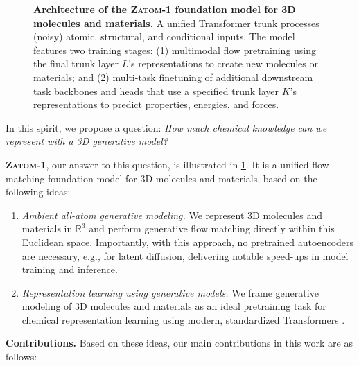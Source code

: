 \documentclass{article}
\theoremstyle{plain}
\theoremstyle{definition}
\theoremstyle{remark}
\begin{document}
\begin{figure}[!ht]
    \centering
    \resizebox{\textwidth}{!}{%
        
    } %
    \caption{\textbf{Architecture of the \textsc{Zatom-1} foundation model for 3D molecules and materials.} A unified Transformer trunk processes (noisy) atomic, structural, and conditional inputs. The model features two training stages: (1) multimodal flow pretraining using the final trunk layer $L$'s representations to create new molecules or materials; and (2) multi-task finetuning of additional downstream task backbones and heads that use a specified trunk layer $K$'s representations to predict properties, energies, and forces.
    }
    \label{figure:zatom_1_overview}
\end{figure}

In this spirit, we propose a question: \textit{How much chemical knowledge can we represent with a 3D generative model?}

\textbf{\textsc{Zatom-1}}, our answer to this question, is illustrated in \cref{figure:zatom_1_overview}.
It is a unified flow matching foundation model for 3D molecules and materials, based on the following ideas:
\begin{enumerate}[noitemsep] %
    \item \textit{Ambient all-atom generative modeling.}
    We represent 3D molecules and materials in $\mathbb{R}^3$ and perform generative flow matching directly within this Euclidean space. Importantly, with this approach, no pretrained autoencoders are necessary, e.g., for latent diffusion, delivering notable speed-ups in model training and inference.
    \item \textit{Representation learning using generative models.}
    We frame generative modeling of 3D molecules and materials as an ideal pretraining task for chemical representation learning \citep{briq2025amazing} using modern, standardized Transformers \citep{vaswani2017attention}.
\end{enumerate}

\textbf{Contributions.} Based on these ideas, our main contributions in this work are as follows:
\end{document}
